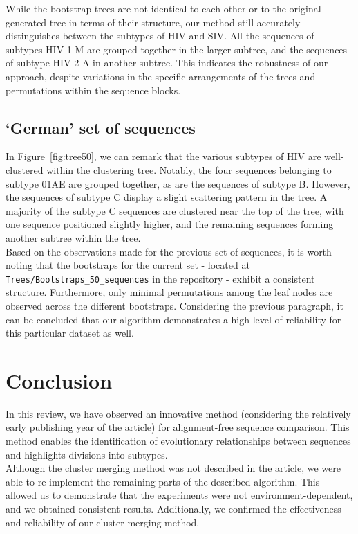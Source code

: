 \documentclass[english,13pt,a4paper]{article}
\theoremstyle{definition}
\theoremstyle{remark}
\theoremstyle{defstyle}
\begin{document}
While the bootstrap trees are not identical to each other or to the original generated tree in terms of their structure, our method still accurately distinguishes between the subtypes of HIV and SIV. All the sequences of subtypes HIV-1-M are grouped together in the larger subtree, and the sequences of subtype HIV-2-A in another subtree. This indicates the robustness of our approach, despite variations in the specific arrangements of the trees and permutations within the sequence blocks.


\subsection{`German' set of sequences}

In Figure~\ref{fig:tree50}, we can remark that the various subtypes of HIV are well-clustered within the clustering tree. Notably, the four sequences belonging to subtype 01AE are grouped together, as are the sequences of subtype B. However, the sequences of subtype C display a slight scattering pattern in the tree. A majority of the subtype C sequences are clustered near the top of the tree, with one sequence positioned slightly higher, and the remaining sequences forming another subtree within the tree.\\

Based on the observations made for the previous set of sequences, it is worth noting that the bootstraps for the current set - located at \texttt{Trees/Bootstraps\_50\_sequences} in the repository - exhibit a consistent structure. Furthermore, only minimal permutations among the leaf nodes are observed across the different bootstraps. Considering the previous paragraph, it can be concluded that our algorithm demonstrates a high level of reliability for this particular dataset as well.

\section{Conclusion}

In this review, we have observed an innovative method (considering the relatively early publishing year of the article) for alignment-free sequence comparison. This method enables the identification of evolutionary relationships between sequences and highlights divisions into subtypes.\\

Although the cluster merging method was not described in the article, we were able to re-implement the remaining parts of the described algorithm. This allowed us to demonstrate that the experiments were not environment-dependent, and we obtained consistent results. Additionally, we confirmed the effectiveness and reliability of our cluster merging method.\\
\end{document}
